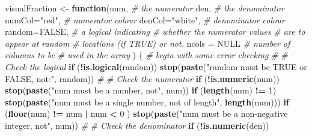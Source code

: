 \documentclass[9pt,letter]{article}
\newenvironment{Shaded}{\begin{snugshade}}{\end{snugshade}}
\newcommand{\KeywordTok}[1]{\textcolor[rgb]{0.13,0.29,0.53}{\textbf{#1}}}
\newcommand{\DataTypeTok}[1]{\textcolor[rgb]{0.13,0.29,0.53}{#1}}
\newcommand{\DecValTok}[1]{\textcolor[rgb]{0.00,0.00,0.81}{#1}}
\newcommand{\StringTok}[1]{\textcolor[rgb]{0.31,0.60,0.02}{#1}}
\newcommand{\CommentTok}[1]{\textcolor[rgb]{0.56,0.35,0.01}{\textit{#1}}}
\newcommand{\OtherTok}[1]{\textcolor[rgb]{0.56,0.35,0.01}{#1}}
\newcommand{\ControlFlowTok}[1]{\textcolor[rgb]{0.13,0.29,0.53}{\textbf{#1}}}
\newcommand{\OperatorTok}[1]{\textcolor[rgb]{0.81,0.36,0.00}{\textbf{#1}}}
\newcommand{\NormalTok}[1]{#1}
\begin{document}
\begin{enumerate}
\begin{Shaded}
\begin{Highlighting}[]
\NormalTok{visualFraction <-}\StringTok{ }\ControlFlowTok{function}\NormalTok{(num, }\CommentTok{# the numerator}
\NormalTok{                           den, }\CommentTok{# the denominator}
                           \DataTypeTok{numCol=}\StringTok{"red"}\NormalTok{,}
                           \CommentTok{# numerator colour}
                           \DataTypeTok{denCol=}\StringTok{"white"}\NormalTok{,}
                           \CommentTok{# denominator colour}
                           \DataTypeTok{random=}\OtherTok{FALSE}\NormalTok{,}
                           \CommentTok{# a logical indicating}
                           \CommentTok{# whether the numerator values}
                           \CommentTok{# are to appear at random}
                           \CommentTok{# locations (if TRUE) or not.}
                           \DataTypeTok{ncols =} \OtherTok{NULL}
                           \CommentTok{# number of columns to be}
                           \CommentTok{# used in the array}
\NormalTok{) \{}
  \CommentTok{# begin with some error checking}
  \CommentTok{#}
  \CommentTok{#  Check the logical}
  \ControlFlowTok{if}\NormalTok{ (}\OperatorTok{!}\KeywordTok{is.logical}\NormalTok{(random))}
    \KeywordTok{stop}\NormalTok{(}\KeywordTok{paste}\NormalTok{(}\StringTok{"random must be TRUE or FALSE, not:"}\NormalTok{,}
\NormalTok{               random))}
  \CommentTok{#}
  \CommentTok{#  Check the numerator}
  \ControlFlowTok{if}\NormalTok{ (}\OperatorTok{!}\KeywordTok{is.numeric}\NormalTok{(num))}
    \KeywordTok{stop}\NormalTok{(}\KeywordTok{paste}\NormalTok{(}\StringTok{"num must be a number, not"}\NormalTok{, num))}
  \ControlFlowTok{if}\NormalTok{ (}\KeywordTok{length}\NormalTok{(num) }\OperatorTok{!=}\StringTok{ }\DecValTok{1}\NormalTok{)}
    \KeywordTok{stop}\NormalTok{(}\KeywordTok{paste}\NormalTok{(}\StringTok{"num must be a single number, not of length"}\NormalTok{,}
               \KeywordTok{length}\NormalTok{(num)))}
  \ControlFlowTok{if}\NormalTok{ (}\KeywordTok{floor}\NormalTok{(num) }\OperatorTok{!=}\StringTok{ }\NormalTok{num }\OperatorTok{|}\StringTok{ }\NormalTok{num }\OperatorTok{<}\StringTok{ }\DecValTok{0}\NormalTok{ )}
    \KeywordTok{stop}\NormalTok{(}\KeywordTok{paste}\NormalTok{(}\StringTok{"num must be a non-negative integer, not"}\NormalTok{,}
\NormalTok{               num))}
  \CommentTok{#}
  \CommentTok{#  Check the denominator}
  \ControlFlowTok{if}\NormalTok{ (}\OperatorTok{!}\KeywordTok{is.numeric}\NormalTok{(den))}

\end{Highlighting}
\end{Shaded}
\end{enumerate}
\end{document}
